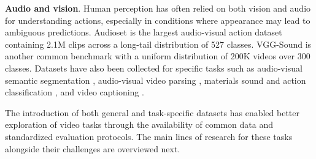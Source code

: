 \noindent
\textbf{Audio and vision}. Human perception has often relied on both vision and audio for understanding actions, especially in conditions where appearance may lead to ambiguous predictions. Audioset \citep{gemmeke2017audio} is the largest audio-visual action dataset containing 2.1M clips across a long-tail distribution of 527 classes. VGG-Sound \citep{chen2020vggsound} is another common benchmark with a uniform distribution of 200K videos over 300 classes. Datasets have also been collected for specific tasks such as audio-visual semantic segmentation \citep{zhou2022audio}, audio-visual video parsing \citep{tian2020unified}, materials sound and action classification \citep{huh2023epic,owens2016visually}, and video captioning \citep{monfort2021spoken}.

The introduction of both general and task-specific datasets has enabled better exploration of video tasks through the availability of common data and standardized evaluation protocols. The main lines of research for these tasks alongside their challenges are overviewed next.